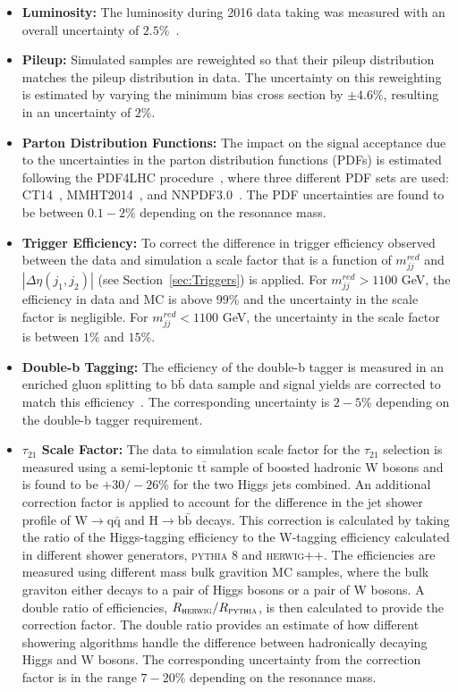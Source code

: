 \begin{itemize}
\item \textbf{Luminosity:} The luminosity during 2016 data taking was measured with an overall uncertainty of $2.5\%$~\cite{Lumi}.

\item \textbf{Pileup:} Simulated samples are reweighted so that their pileup distribution matches the pileup distribution in data. The uncertainty on this reweighting is estimated by varying the minimum bias cross section by $\pm4.6\%$, resulting in an uncertainty of $2\%$.

\item \textbf{Parton Distribution Functions:} The impact on the signal acceptance due to the uncertainties in the parton distribution functions (PDFs) is estimated following the PDF4LHC procedure~\cite{PDFUncertinty}, where three different PDF sets are used: CT14~\cite{CT14}, MMHT2014~\cite{MMHT}, and NNPDF3.0~\cite{NNPDF}. The PDF uncertainties are found to be between $0.1-2\%$ depending on the resonance mass.

\item \textbf{Trigger Efficiency:} To correct the difference in trigger efficiency observed between the data and simulation a scale factor that is a function of $m_{jj}^{red}$ and $|\Delta\eta(j_{1},j_{2})|$ (see Section~\ref{sec:Triggers}) is applied. For $m_{jj}^{red} > 1100$ GeV, the efficiency in data and MC is above $99\%$ and the uncertainty in the scale factor is negligible. For $m_{jj}^{red} < 1100$ GeV, the uncertainty in the scale factor is between $1\%$ and $15\%$. 

\item \textbf{Double-b Tagging:} The efficiency of the double-b tagger is measured in an enriched gluon splitting to $\mathrm{b\bar{b}}$ data sample and signal yields are corrected to match this efficiency~\cite{DoubleB}. The corresponding uncertainty is $2-5\%$ depending on the double-b tagger requirement.

\item \textbf{$\tau_{21}$ Scale Factor:} The data to simulation scale factor for the $\tau_{21}$ selection is measured using a semi-leptonic $\mathrm{t\bar{t}}$ sample of boosted hadronic W bosons and is found to be $+30/-26\%$ for the two Higgs jets combined. An additional correction factor is applied to account for the difference in the jet shower profile of $\mathrm{W}\rightarrow \mathrm{q\bar{q}}$ and $\mathrm{H}\rightarrow \mathrm{b\bar{b}}$ decays. This correction is calculated by taking the ratio of the Higgs-tagging efficiency to the W-tagging efficiency calculated in different shower generators, \textsc{pythia 8} and \textsc{herwig++}. The efficiencies are measured using different mass bulk gravition MC samples, where the bulk graviton either decays to a pair of Higgs bosons or a pair of W bosons. A double ratio of efficiencies, $R_{\textsc{herwig}}/R_{\textsc{pythia}}$, is then calculated to provide the correction factor. The double ratio provides an estimate of how different showering algorithms handle the difference between hadronically decaying Higgs and W bosons. The corresponding uncertainty from the correction factor is in the range $7-20\%$ depending on the resonance mass.


\end{itemize}
